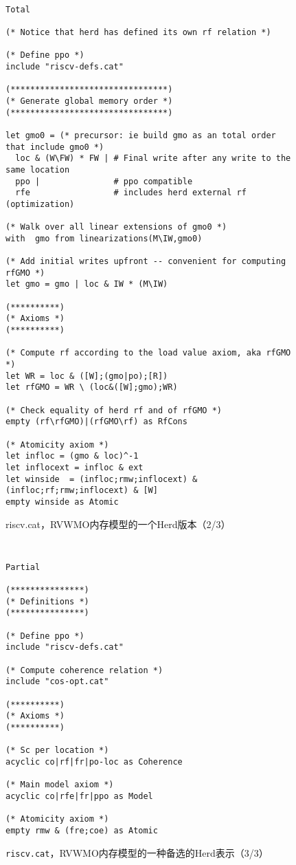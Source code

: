 \begin{figure}[ht!]
  {
  \tt\bfseries\centering\footnotesize
  \begin{lstlisting}
Total

(* Notice that herd has defined its own rf relation *)

(* Define ppo *)
include "riscv-defs.cat"

(********************************)
(* Generate global memory order *)
(********************************)

let gmo0 = (* precursor: ie build gmo as an total order that include gmo0 *)
  loc & (W\FW) * FW | # Final write after any write to the same location
  ppo |               # ppo compatible
  rfe                 # includes herd external rf (optimization)

(* Walk over all linear extensions of gmo0 *)
with  gmo from linearizations(M\IW,gmo0)

(* Add initial writes upfront -- convenient for computing rfGMO *)
let gmo = gmo | loc & IW * (M\IW)

(**********)
(* Axioms *)
(**********)

(* Compute rf according to the load value axiom, aka rfGMO *)
let WR = loc & ([W];(gmo|po);[R])
let rfGMO = WR \ (loc&([W];gmo);WR)

(* Check equality of herd rf and of rfGMO *)
empty (rf\rfGMO)|(rfGMO\rf) as RfCons

(* Atomicity axiom *)
let infloc = (gmo & loc)^-1
let inflocext = infloc & ext
let winside  = (infloc;rmw;inflocext) & (infloc;rf;rmw;inflocext) & [W]
empty winside as Atomic
\end{lstlisting}
  }
  \caption{riscv.cat，RVWMO内存模型的一个Herd版本（2/3）
    }
  \label{fig:herd2}
\end{figure}

\begin{figure}[h!]
  {
  \tt\bfseries\centering\footnotesize
  \begin{lstlisting}
Partial

(***************)
(* Definitions *)
(***************)

(* Define ppo *)
include "riscv-defs.cat"

(* Compute coherence relation *)
include "cos-opt.cat"

(**********)
(* Axioms *)
(**********)

(* Sc per location *)
acyclic co|rf|fr|po-loc as Coherence

(* Main model axiom *)
acyclic co|rfe|fr|ppo as Model

(* Atomicity axiom *)
empty rmw & (fre;coe) as Atomic
\end{lstlisting}
  }
  \caption{{\tt riscv.cat}，RVWMO内存模型的一种备选的Herd表示（3/3）
    }
  \label{fig:herd3}
\end{figure}

